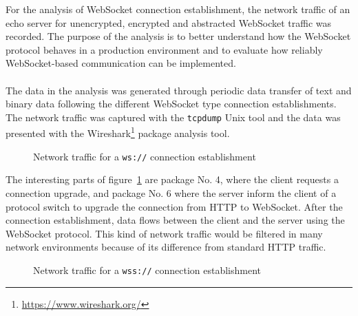 For the analysis of WebSocket connection establishment, the network traffic of an echo server for unencrypted, encrypted and abstracted WebSocket traffic was recorded. The purpose of the analysis is to better understand how the WebSocket protocol behaves in a production environment and to evaluate how reliably WebSocket-based communication can be implemented.
\\ \\
The data in the analysis was generated through periodic data transfer of text and binary data following the different WebSocket type connection establishments. The network traffic was captured with the \texttt{tcpdump} Unix tool and the data was presented with the Wireshark\footnote{\url{https://www.wireshark.org/}} package analysis tool.
\\
\begin{figure}[h!]
	\centering
	\caption{Network traffic for a \texttt{ws://} connection establishment}
	\label{fig:wsTraffic}
\end{figure}

\noindent
The interesting parts of figure~\ref{fig:wsTraffic} are package No. 4, where the client requests a connection upgrade, and package No. 6 where the server inform the client of a protocol switch to upgrade the connection from HTTP to WebSocket. After the connection establishment, data flows between the client and the server using the WebSocket protocol. This kind of network traffic would be filtered in many network environments because of its difference from standard HTTP traffic.
\\
\begin{figure}[h!]
	\centering
	\caption{Network traffic for a \texttt{wss://} connection establishment}
	\label{fig:wssTraffic}
\end{figure}

